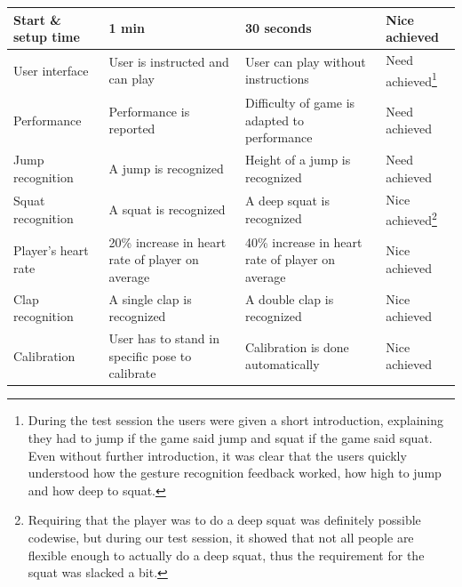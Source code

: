 \documentclass[11pt]{report}
\begin{document}
\begin{center}
\begin{longtable}{| p{3.2cm} | p{3.75cm} | p{3.75cm} | p{2.55cm} |}
\hline
Start \& setup time & 1 min & 30 seconds & Nice achieved \\ \hline
User interface & User is instructed and can play & User can play without instructions & Need achieved\footnote{During the test session the users were given a short introduction, explaining they had to jump if the game said jump and squat if the game said squat. Even without further introduction, it was clear that the users quickly understood how the gesture recognition feedback worked, how high to jump and how deep to squat.} \\ \hline
Performance & Performance is reported & Difficulty of game is adapted to performance & Need achieved \\ \hline
Jump recognition & A jump is recognized & Height of a jump is recognized & Need achieved \\ \hline
Squat recognition & A squat is recognized & A deep squat is recognized & Nice achieved\footnote{Requiring that the player was to do a deep squat was definitely possible codewise, but during our test session, it showed that not all people are flexible enough to actually do a deep squat, thus the requirement for the squat was slacked a bit.} \\ \hline
Player's heart rate & 20\% increase in heart rate of player on average & 40\% increase in heart rate of player on average & Nice achieved  \\ \hline
Clap recognition & A single clap is recognized & A double clap is recognized & Nice achieved \\ \hline
Calibration & User has to stand in specific pose to calibrate & Calibration is done automatically & Nice achieved \\ \hline
\end{longtable}
\end{center}
\end{document}
